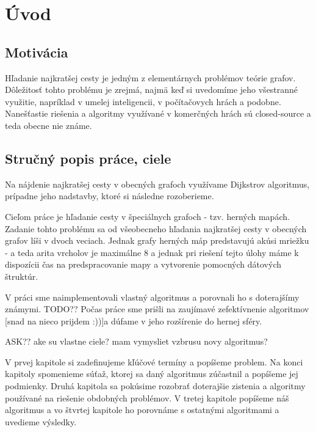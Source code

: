 \chapter*{Úvod}

\section{Motivácia}
Hľadanie najkratšej cesty je jedným z elementárnych problémov teórie grafov.
Dôležitosť tohto problému je zrejmá, najmä keď si uvedomíme jeho všestranné využitie, napríklad v 
umelej inteligencii, v počítačovych hrách a podobne. Nanešťastie riešenia a algoritmy využívané v komerčných hrách 
sú closed-source a teda obecne nie známe.

\section{Stručný popis práce, ciele}
Na nájdenie najkratšej cesty v obecných grafoch využívame Dijkstrov algoritmus, prípadne jeho nadstavby, ktoré si následne rozoberieme.

Cieľom práce je hľadanie cesty v špeciálnych grafoch - tzv. herných mapách. 
Zadanie tohto problému sa od všeobecneho hľadania najkratšej cesty v obecných grafov líši v dvoch veciach.
Jednak grafy herných máp predstavujú akúsi mriežku - a teda arita vrcholov je maximálne 8 a jednak pri riešení tejto úlohy máme k dispozícii čas
na predspracovanie mapy a vytvorenie pomocných dátových štruktúr.


V práci sme naimplementovali vlastný algoritmus a porovnali ho s doterajšímy známymi.
TODO?? Počas práce sme prišli na zaujímavé zefektívnenie algoritmov [snad na nieco prijdem :))]a dúfame v jeho rozšírenie do hernej sféry.

ASK?? ake su vlastne ciele? mam vymysliet vzbrusu novy algoritmus?

V prvej kapitole si zadefinujeme kľúčové termíny a popíšeme problem. Na konci kapitoly spomenieme súťaž, ktorej sa daný algoritmus zúčastnil 
a popíšeme jej podmienky.
Druhá kapitola sa pokúsime rozobrať doterajšie zistenia a algoritmy používané na riešenie obdobných problémov.
V tretej kapitole popíšeme náš algoritmus a vo štvrtej kapitole ho porovnáme s ostatnými algoritmami a uvedieme výsledky.